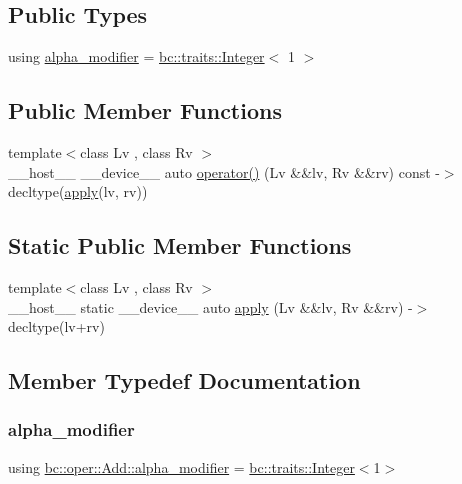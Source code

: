 \subsection*{Public Types}
\begin{DoxyCompactItemize}
\item 
using \hyperlink{structbc_1_1oper_1_1Add_a72e4a8cfa013493278c180a605f38cb0}{alpha\+\_\+modifier} = \hyperlink{structbc_1_1traits_1_1Integer}{bc\+::traits\+::\+Integer}$<$ 1 $>$
\end{DoxyCompactItemize}
\subsection*{Public Member Functions}
\begin{DoxyCompactItemize}
\item 
{\footnotesize template$<$class Lv , class Rv $>$ }\\\+\_\+\+\_\+host\+\_\+\+\_\+ \+\_\+\+\_\+device\+\_\+\+\_\+ auto \hyperlink{structbc_1_1oper_1_1Add_af3d71f0cd740124171f9a92162125068}{operator()} (Lv \&\&lv, Rv \&\&rv) const -\/$>$ decltype(\hyperlink{structbc_1_1oper_1_1Add_a2cf484e25e4aa7d787f85da0f9807fd4}{apply}(lv, rv))
\end{DoxyCompactItemize}
\subsection*{Static Public Member Functions}
\begin{DoxyCompactItemize}
\item 
{\footnotesize template$<$class Lv , class Rv $>$ }\\\+\_\+\+\_\+host\+\_\+\+\_\+ static \+\_\+\+\_\+device\+\_\+\+\_\+ auto \hyperlink{structbc_1_1oper_1_1Add_a2cf484e25e4aa7d787f85da0f9807fd4}{apply} (Lv \&\&lv, Rv \&\&rv) -\/$>$ decltype(lv+rv)
\end{DoxyCompactItemize}


\subsection{Member Typedef Documentation}
\mbox{\label{structbc_1_1oper_1_1Add_a72e4a8cfa013493278c180a605f38cb0}} 
\subsubsection{\texorpdfstring{alpha\+\_\+modifier}{alpha\_modifier}}
{\footnotesize\ttfamily using \hyperlink{structbc_1_1oper_1_1Add_a72e4a8cfa013493278c180a605f38cb0}{bc\+::oper\+::\+Add\+::alpha\+\_\+modifier} =  \hyperlink{structbc_1_1traits_1_1Integer}{bc\+::traits\+::\+Integer}$<$1$>$}



